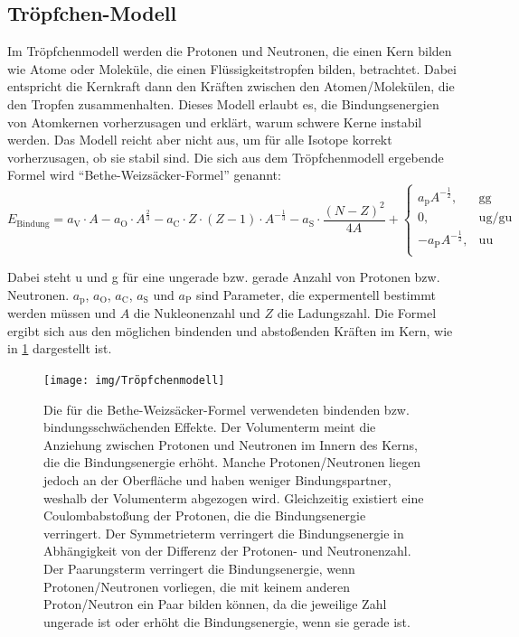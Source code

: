 \documentclass[
	a4paper,
	12pt,
	pagesize,
	ngerman
]{scrartcl}
\begin{document}
		\subsection*{Tröpfchen-Modell} %

		Im Tröpfchenmodell werden die Protonen und Neutronen, die einen Kern bilden wie Atome oder Moleküle, die einen Flüssigkeitstropfen bilden, betrachtet.
		Dabei entspricht die Kernkraft dann den Kräften zwischen den Atomen/Molekülen, die den Tropfen zusammenhalten.
		Dieses Modell erlaubt es, die Bindungsenergien von Atomkernen vorherzusagen und erklärt, warum schwere Kerne instabil werden.
		Das Modell reicht aber nicht aus, um für alle Isotope korrekt vorherzusagen, ob sie stabil sind. %
		Die sich aus dem Tröpfchenmodell ergebende Formel wird \enquote{Bethe-Weizsäcker-Formel} genannt:
		\begin{equation}
			E_\text{Bindung} = a_\text{V} \cdot A - a_\text{O} \cdot A^{\frac{2}{3}}
			-a_\text{C} \cdot Z \cdot (Z-1) \cdot A^{- \frac{1}{3}} - a_\text{S} \cdot \frac{(N-Z)^2}{4A} +
			\begin{cases}
				a_\text{p} A^{- \frac{1}{2}}, &\text{gg}\\
				0, &\text{ug/gu}\\
				-a_\text{P} A^{- \frac{1}{2}}, &\text{uu}\\
			\end{cases}
		\end{equation}

		Dabei steht u und g für eine ungerade bzw. gerade Anzahl von Protonen bzw. Neutronen.
		$a_\text{p}$, $a_\text{O}$, $a_\text{C}$, $a_\text{S}$ und $a_\text{P}$ sind Parameter, die expermentell bestimmt werden müssen und $A$ die Nukleonenzahl und $Z$ die Ladungszahl.
		Die Formel ergibt sich aus den möglichen bindenden und abstoßenden Kräften im Kern, wie in \cref{bethe} dargestellt ist.

		\begin{figure}[H]
				\texttt{[image: img/Tröpfchenmodell]}
				\caption{
				Die für die Bethe-Weizsäcker-Formel verwendeten bindenden bzw. bindungsschwächenden Effekte.
				Der Volumenterm meint die Anziehung zwischen Protonen und Neutronen im Innern des Kerns, die die Bindungsenergie erhöht.
				Manche Protonen/Neutronen liegen jedoch an der Oberfläche und haben weniger Bindungspartner, weshalb der Volumenterm abgezogen wird.
				Gleichzeitig existiert eine Coulombabstoßung der Protonen, die die Bindungsenergie verringert.
				Der Symmetrieterm verringert die Bindungsenergie in Abhängigkeit von der Differenz der Protonen- und Neutronenzahl.
				Der Paarungsterm verringert die Bindungsenergie, wenn Protonen/Neutronen vorliegen, die mit keinem anderen Proton/Neutron ein Paar bilden können, da die jeweilige Zahl ungerade ist oder erhöht die Bindungsenergie, wenn sie gerade ist.
				\cite{bethewiki}
				}
				\label{bethe}
		\end{figure}
\end{document}
